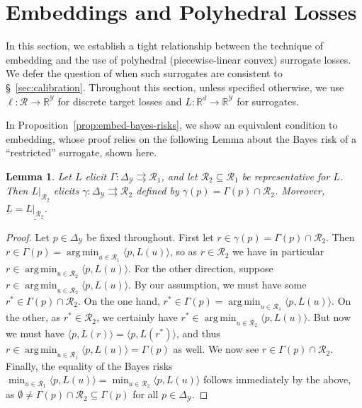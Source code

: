 \documentclass[11pt]{article}
\newcommand{\Comments}{1}
\newcommand{\mytodo}[2]{\ifnum\Comments=1%
  \todo[linecolor=#1!80!black,backgroundcolor=#1,bordercolor=#1!80!black]{#2}\fi}
\newcommand{\jessiet}[1]{\mytodo{teal!20!white}{JF: #1}}
\newcommand{\reals}{\mathbb{R}}
\newcommand{\simplex}{\Delta_\Y}
\newcommand{\R}{\mathcal{R}}
\newcommand{\Sc}{\mathcal{S}}
\newcommand{\Y}{\mathcal{Y}}
\newcommand{\risk}[1]{\underline{#1}}
\newcommand{\inprod}[2]{\langle #1, #2 \rangle}%
\newcommand{\inter}[1]{\mathring{#1}}%
\newcommand{\toto}{\rightrightarrows}
\DeclareMathOperator*{\argmin}{arg\,min}
\newtheorem{lemma}{Lemma}
\newtheorem{definition}{Definition}
\begin{document}
\section{Embeddings and Polyhedral Losses}
\label{sec:poly-loss-embed}

In this section, we establish a tight relationship between the technique of embedding and the use of polyhedral (piecewise-linear convex) surrogate losses.
We defer the question of when such surrogates are consistent to \S~\ref{sec:calibration}. 
Throughout this section, unless specified otherwise, we use $\ell:\R\to\reals^\Y$ for discrete target losses and $L:\reals^d\to\reals^\Y$ for surrogates.

In Proposition~\ref{prop:embed-bayes-risks}, we show an equivalent condition to embedding, whose proof relies on the following Lemma about the Bayes risk of a ``restricted'' surrogate, shown here.
\begin{lemma}\label{lem:loss-restrict}
  Let $L$ elicit $\Gamma:\simplex\toto\R_1$, and let $\R_2\subseteq\R_1$ be representative for $L$.
  Then $L|_{\R_2}$ elicits $\gamma:\simplex\toto\R_2$ defined by $\gamma(p) = \Gamma(p)\cap \R_2$.
  Moreover, $\risk{L}=\risk{L|_{\R_2}}$.
\end{lemma}
\begin{proof}
	Let $p\in\simplex$ be fixed throughout.
	First let $r \in \gamma(p) = \Gamma(p) \cap \R_2$.
	Then $r \in \Gamma(p) = \argmin_{u\in\R_1} \inprod{p}{L(u)}$, so as $r\in\R_2$ we have in particular $r \in \argmin_{u\in\R_2} \inprod{p}{L(u)}$.
	For the other direction, suppose $r \in \argmin_{u\in\R_2} \inprod{p}{L(u)}$.
	By our assumption, we must have some $r^* \in \Gamma(p) \cap \R_2$.
	On the one hand, $r^*\in\Gamma(p) = \argmin_{u\in\R_1} \inprod{p}{L(u)}$.
	On the other, as $r^* \in \R_2$, we certainly have $r^* \in \argmin_{u\in\R_2} \inprod{p}{L(u)}$.
	But now we must have $\inprod{p}{L(r)} = \inprod{p}{L(r^*)}$, and thus $r \in \argmin_{u\in\R_1} \inprod{p}{L(u)} = \Gamma(p)$ as well.
	We now see $r \in \Gamma(p) \cap \R_2$.
	Finally, the equality of the Bayes risks $\min_{u\in\R_1} \inprod{p}{L(u)} = \min_{u\in\R_2} \inprod{p}{L(u)}$ follows immediately by the above, as $\emptyset \neq \Gamma(p)\cap\R_2 \subseteq \Gamma(p)$ for all $p\in\simplex$.
\end{proof}


\end{document}
